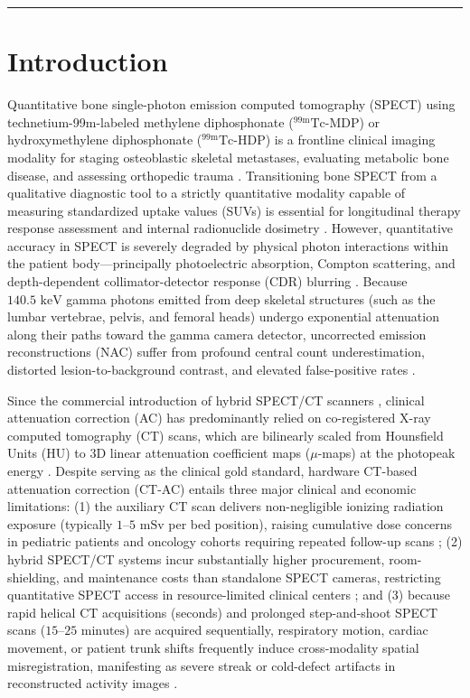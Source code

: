 \documentclass[11pt, a4paper]{article}
\begin{document}
\hrule
\vspace{1em}

\section{Introduction}

Quantitative bone single-photon emission computed tomography (SPECT) using technetium-99m-labeled methylene diphosphonate ($^{99\text{m}}\text{Tc}$-MDP) or hydroxymethylene diphosphonate ($^{99\text{m}}\text{Tc}$-HDP) is a frontline clinical imaging modality for staging osteoblastic skeletal metastases, evaluating metabolic bone disease, and assessing orthopedic trauma \cite{ref1, ref2}. Transitioning bone SPECT from a qualitative diagnostic tool to a strictly quantitative modality capable of measuring standardized uptake values (SUVs) is essential for longitudinal therapy response assessment and internal radionuclide dosimetry \cite{ref2, ref3}. However, quantitative accuracy in SPECT is severely degraded by physical photon interactions within the patient body---principally photoelectric absorption, Compton scattering, and depth-dependent collimator-detector response (CDR) blurring \cite{ref4, ref5}. Because $140.5\text{ keV}$ gamma photons emitted from deep skeletal structures (such as the lumbar vertebrae, pelvis, and femoral heads) undergo exponential attenuation along their paths toward the gamma camera detector, uncorrected emission reconstructions (NAC) suffer from profound central count underestimation, distorted lesion-to-background contrast, and elevated false-positive rates \cite{ref5, ref6}.

Since the commercial introduction of hybrid SPECT/CT scanners \cite{ref6}, clinical attenuation correction (AC) has predominantly relied on co-registered X-ray computed tomography (CT) scans, which are bilinearly scaled from Hounsfield Units (HU) to 3D linear attenuation coefficient maps ($\mu$-maps) at the photopeak energy \cite{ref4, ref6}. Despite serving as the clinical gold standard, hardware CT-based attenuation correction (CT-AC) entails three major clinical and economic limitations: (1) the auxiliary CT scan delivers non-negligible ionizing radiation exposure (typically $1\text{--}5\text{ mSv}$ per bed position), raising cumulative dose concerns in pediatric patients and oncology cohorts requiring repeated follow-up scans \cite{ref7, ref8}; (2) hybrid SPECT/CT systems incur substantially higher procurement, room-shielding, and maintenance costs than standalone SPECT cameras, restricting quantitative SPECT access in resource-limited clinical centers \cite{ref8, ref9}; and (3) because rapid helical CT acquisitions (seconds) and prolonged step-and-shoot SPECT scans ($15\text{--}25\text{ minutes}$) are acquired sequentially, respiratory motion, cardiac movement, or patient trunk shifts frequently induce cross-modality spatial misregistration, manifesting as severe streak or cold-defect artifacts in reconstructed activity images \cite{ref7, ref10}.
\end{document}
